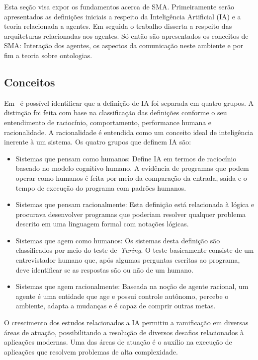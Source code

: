 Esta seção visa expor os fundamentos acerca de SMA. Primeiramente serão apresentados as definições iniciais a respeito da Inteligência Artificial (IA) e a teoria relacionada a agentes. Em seguida o trabalho disserta a respeito das arquiteturas relacionadas aos agentes. Só então são apresentados os conceitos de SMA: Interação dos agentes, os aspectos da comunicação neste ambiente e por fim a teoria sobre ontologias.

\subsection{Conceitos}

Em~\cite{novig95} é possível identificar que a definição de IA foi separada em quatro grupos. A distinção foi feita com base na classificação das definições conforme o seu entendimento de raciocínio, comportamento, performance humana e racionalidade. A racionalidade é entendida como um conceito ideal de inteligência inerente à um sistema. Os quatro grupos que definem IA são:

\begin{itemize}
	\item Sistemas que pensam como humanos: Define IA em termos de raciocínio baseado no modelo cognitivo humano. A evidência de programas que podem operar como humanos é feita por meio da comparação da entrada, saída e o tempo de execução do programa com padrões humanos.
	\item Sistemas que pensam racionalmente: Esta definição está relacionada à lógica e procurava desenvolver programas que poderiam resolver qualquer problema descrito em uma linguagem formal com notações lógicas.
	\item Sistemas que agem como humanos: Os sistemas desta definição são classificados por meio do teste de~\emph{Turing}. O teste basicamente consiste de um entrevistador humano que, após algumas perguntas escritas ao programa, deve identificar se as respostas são ou não de um humano.
	\item Sistemas que agem racionalmente: Baseada na noção de agente racional, um agente é uma entidade que age e possui controle autônomo, percebe o ambiente, adapta a mudanças e é capaz de comprir outras metas.
\end{itemize}

O crescimento dos estudos relacionados a IA permitiu a ramificação em diversas áreas de atuação, possibilitando a resolução de diversos desafios relacionados à aplicações modernas. Uma das áreas de atuação é o auxílio na execução de aplicações que resolvem problemas de alta complexidade. 

